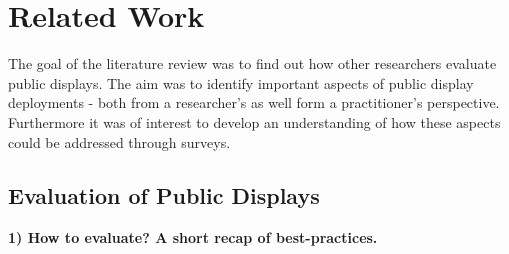 \section{Related Work}
\label{sec:related-work}


	The goal of the literature review was to find out how other researchers evaluate public displays. The aim was to identify important aspects of public display deployments - both from a researcher's as well form a practitioner's perspective. Furthermore it was of interest to develop an understanding of how these aspects could be addressed through surveys. 









\subsection{Evaluation of Public Displays}


	\textbf{1) How to evaluate? A short recap of best-practices.}


